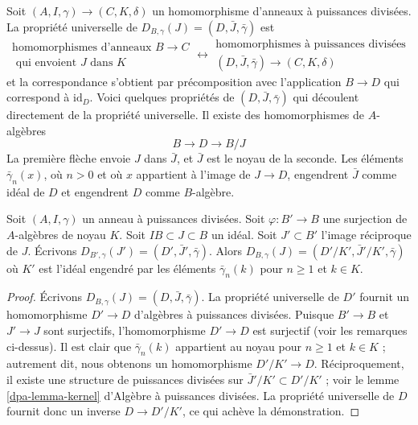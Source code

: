 \noindent
Soit $(A, I, \gamma) \to (C, K, \delta)$ un homomorphisme d'anneaux à
puissances divisées. La propriété universelle de
$D_{B, \gamma}(J) = (D, \bar J, \bar \gamma)$ est
$$
\begin{matrix}
\text{homomorphismes d'anneaux }B \to C \\
\text{ qui envoient }J\text{ dans }K
\end{matrix}
\longleftrightarrow
\begin{matrix}
\text{homomorphismes à puissances divisées} \\
(D, \bar J, \bar \gamma) \to (C, K, \delta)
\end{matrix}
$$
et la correspondance s'obtient par précomposition avec l'application $B \to D$
qui correspond à $\text{id}_D$. Voici quelques propriétés de
$(D, \bar J, \bar \gamma)$ qui découlent directement de la propriété
universelle. Il existe des homomorphismes de $A$-algèbres
\begin{equation}
\label{equation-divided-power-envelope}
B \longrightarrow D \longrightarrow B/J
\end{equation}
La première flèche envoie $J$ dans $\bar J$, et $\bar J$ est le noyau
de la seconde. Les éléments $\bar\gamma_n(x)$, où $n > 0$
et où $x$ appartient à l'image de $J \to D$, engendrent $\bar J$
comme idéal de $D$ et engendrent $D$ comme $B$-algèbre.

\begin{lemma}
\label{lemma-divided-power-envelop-quotient}
Soit $(A, I, \gamma)$ un anneau à puissances divisées.
Soit $\varphi : B' \to B$ une surjection de $A$-algèbres de noyau $K$.
Soit $IB \subset J \subset B$ un idéal. Soit $J' \subset B'$
l'image réciproque de $J$. Écrivons
$D_{B', \gamma}(J') = (D', \bar J', \bar\gamma)$.
Alors $D_{B, \gamma}(J) = (D'/K', \bar J'/K', \bar\gamma)$
où $K'$ est l'idéal engendré par les éléments $\bar\gamma_n(k)$
pour $n \geq 1$ et $k \in K$.
\end{lemma}

\begin{proof}
Écrivons $D_{B, \gamma}(J) = (D, \bar J, \bar \gamma)$.
La propriété universelle de $D'$ fournit un homomorphisme $D' \to D$
d'algèbres à puissances divisées. Puisque $B' \to B$ et $J' \to J$ sont surjectifs,
l'homomorphisme $D' \to D$ est surjectif (voir les remarques ci-dessus). Il est clair que
$\bar\gamma_n(k)$ appartient au noyau pour $n \geq 1$ et $k \in K$ ; autrement dit,
nous obtenons un homomorphisme $D'/K' \to D$. Réciproquement, il existe une structure de
puissances divisées sur $\bar J'/K' \subset D'/K'$ ; voir le
lemme \ref{dpa-lemma-kernel} d'Algèbre à puissances divisées.
La propriété universelle de $D$ fournit donc un inverse $D \to D'/K'$, ce qui achève la démonstration.
\end{proof}

